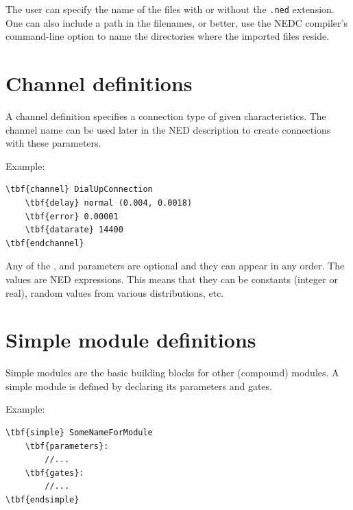The user can specify the name of the files with or without the
\texttt{.ned} extension. One can also include a path in the
filenames, or better, use the NEDC compiler's
 command-line option to name the directories where the
imported files reside.





\section{Channel definitions}


A channel definition specifies a connection type of given characteristics.
The channel name can be used later in the NED description to
create connections with these parameters.


Example:

\begin{Verbatim}[commandchars=\\\{\}]
\tbf{channel} DialUpConnection
    \tbf{delay} normal (0.004, 0.0018)
    \tbf{error} 0.00001
    \tbf{datarate} 14400
\tbf{endchannel}
\end{Verbatim}

Any of the ,  and  parameters
are optional and they can appear in any order. The values are NED
expressions.  This means that they can be
constants (integer or real), random values from various distributions,
etc.





\section{Simple module definitions}


Simple modules are the basic building blocks for other (compound)
modules. A simple module is defined by
declaring its parameters and
gates.

Example:

\begin{Verbatim}[commandchars=\\\{\}]
\tbf{simple} SomeNameForModule
    \tbf{parameters}:
        //...
    \tbf{gates}:
        //...
\tbf{endsimple}
\end{Verbatim}



